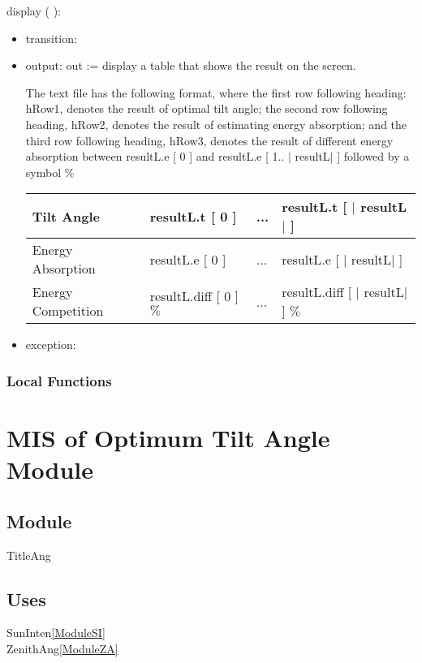\documentclass[12pt, titlepage]{article}
\begin{document}
\noindent  display ( ):
\begin{itemize}
\item transition:
\item output: out := display a table that shows the result on the screen.

The text file has the following format, where the first row following heading: hRow1, denotes the result of optimal tilt angle; the second row following heading, hRow2, denotes the result of estimating energy absorption; and the third row following heading, hRow3, denotes the result of different energy absorption between resultL.e [ 0 ] and resultL.e [ 1.. $|$ resultL$|$ ] followed by a symbol $\%$


\begin{center}
\begin{tabular}{p{4.5cm}|p{4cm}|p{1cm}|p{5cm}}

\hline 
Tilt Angle & resultL.t [ 0 ] & ...  & resultL.t [ $|$ resultL$|$ ] \\
\hline 
Energy Absorption & resultL.e [ 0 ] & ...  & resultL.e [ $|$ resultL$|$ ] \\
\hline 
Energy Competition & resultL.diff [ 0 ] $\%$    & ...     & resultL.diff [ $|$ resultL$|$ ] $\%$    \\
\hline
\end{tabular}
\end{center}

\item exception: 
\end{itemize}


\subsubsection{Local Functions}


\section{MIS of Optimum Tilt Angle Module} \label{ModuleTA} 

\subsection{Module}
TitleAng

\subsection{Uses}
SunInten\ref{ModuleSI}\\
ZenithAng\ref{ModuleZA}\\
\end{document}
